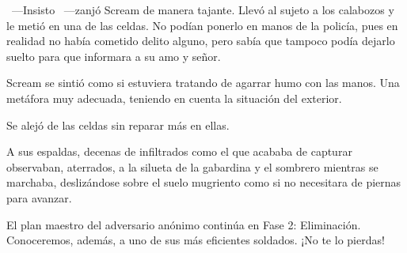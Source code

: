 ~---Insisto ~---zanjó Scream de manera tajante. Llevó al sujeto a los calabozos y le metió en una de las celdas. No podían ponerlo en manos de la policía, pues en realidad no había cometido delito alguno, pero sabía que tampoco podía dejarlo suelto para que informara a su amo y señor.

Scream se sintió como si estuviera tratando de agarrar humo con las manos. Una metáfora muy adecuada, teniendo en cuenta la situación del exterior.

Se alejó de las celdas sin reparar más en ellas.

A sus espaldas, decenas de infiltrados como el que acababa de capturar observaban, aterrados, a la silueta de la gabardina y el sombrero mientras se marchaba, deslizándose sobre el suelo mugriento como si no necesitara de piernas para avanzar.

\begin{next}
    El plan maestro del adversario anónimo continúa en Fase 2: Eliminación. Conoceremos, además, a uno de sus más eficientes soldados. ¡No te lo pierdas!
\end{next}
